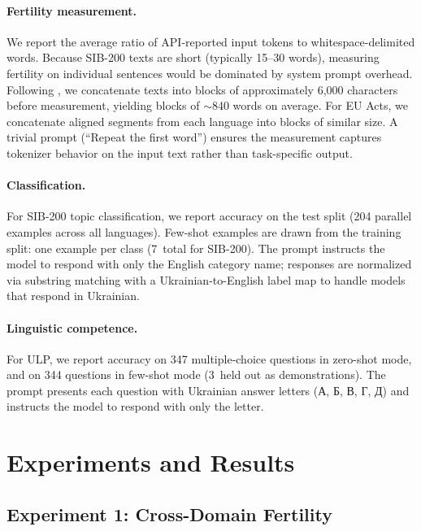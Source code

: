 \documentclass[11pt,a4paper]{article}
\begin{document}
\paragraph{Fertility measurement.} We report the average ratio of API-reported input tokens to whitespace-delimited words. Because SIB-200 texts are short (typically 15--30 words), measuring fertility on individual sentences would be dominated by system prompt overhead. Following \citet{ovcharov2026tokenizer}, we concatenate texts into blocks of approximately 6,000 characters before measurement, yielding blocks of ${\sim}$840 words on average. For EU Acts, we concatenate aligned segments from each language into blocks of similar size. A trivial prompt (``Repeat the first word'') ensures the measurement captures tokenizer behavior on the input text rather than task-specific output.

\paragraph{Classification.} For SIB-200 topic classification, we report accuracy on the test split (204 parallel examples across all languages). Few-shot examples are drawn from the training split: one example per class (7~total for SIB-200). The prompt instructs the model to respond with only the English category name; responses are normalized via substring matching with a Ukrainian-to-English label map to handle models that respond in Ukrainian.

\paragraph{Linguistic competence.} For ULP, we report accuracy on 347 multiple-choice questions in zero-shot mode, and on 344 questions in few-shot mode (3~held out as demonstrations). The prompt presents each question with Ukrainian answer letters (\foreignlanguage{ukrainian}{А, Б, В, Г, Д}) and instructs the model to respond with only the letter.

\section{Experiments and Results}

\subsection{Experiment 1: Cross-Domain Fertility}
\label{sec:exp1}
\end{document}
